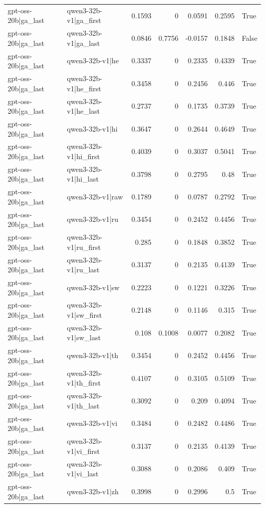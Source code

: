 \begin{table}
\begin{tabular}{l l r r r r l}
gpt-oss-20b|ga_last & qwen3-32b-v1|ga_first & 0.1593 & 0 & 0.0591 & 0.2595 & True \\
gpt-oss-20b|ga_last & qwen3-32b-v1|ga_last & 0.0846 & 0.7756 & -0.0157 & 0.1848 & False \\
gpt-oss-20b|ga_last & qwen3-32b-v1|he & 0.3337 & 0 & 0.2335 & 0.4339 & True \\
gpt-oss-20b|ga_last & qwen3-32b-v1|he_first & 0.3458 & 0 & 0.2456 & 0.446 & True \\
gpt-oss-20b|ga_last & qwen3-32b-v1|he_last & 0.2737 & 0 & 0.1735 & 0.3739 & True \\
gpt-oss-20b|ga_last & qwen3-32b-v1|hi & 0.3647 & 0 & 0.2644 & 0.4649 & True \\
gpt-oss-20b|ga_last & qwen3-32b-v1|hi_first & 0.4039 & 0 & 0.3037 & 0.5041 & True \\
gpt-oss-20b|ga_last & qwen3-32b-v1|hi_last & 0.3798 & 0 & 0.2795 & 0.48 & True \\
gpt-oss-20b|ga_last & qwen3-32b-v1|raw & 0.1789 & 0 & 0.0787 & 0.2792 & True \\
gpt-oss-20b|ga_last & qwen3-32b-v1|ru & 0.3454 & 0 & 0.2452 & 0.4456 & True \\
gpt-oss-20b|ga_last & qwen3-32b-v1|ru_first & 0.285 & 0 & 0.1848 & 0.3852 & True \\
gpt-oss-20b|ga_last & qwen3-32b-v1|ru_last & 0.3137 & 0 & 0.2135 & 0.4139 & True \\
gpt-oss-20b|ga_last & qwen3-32b-v1|sw & 0.2223 & 0 & 0.1221 & 0.3226 & True \\
gpt-oss-20b|ga_last & qwen3-32b-v1|sw_first & 0.2148 & 0 & 0.1146 & 0.315 & True \\
gpt-oss-20b|ga_last & qwen3-32b-v1|sw_last & 0.108 & 0.1008 & 0.0077 & 0.2082 & True \\
gpt-oss-20b|ga_last & qwen3-32b-v1|th & 0.3454 & 0 & 0.2452 & 0.4456 & True \\
gpt-oss-20b|ga_last & qwen3-32b-v1|th_first & 0.4107 & 0 & 0.3105 & 0.5109 & True \\
gpt-oss-20b|ga_last & qwen3-32b-v1|th_last & 0.3092 & 0 & 0.209 & 0.4094 & True \\
gpt-oss-20b|ga_last & qwen3-32b-v1|vi & 0.3484 & 0 & 0.2482 & 0.4486 & True \\
gpt-oss-20b|ga_last & qwen3-32b-v1|vi_first & 0.3137 & 0 & 0.2135 & 0.4139 & True \\
gpt-oss-20b|ga_last & qwen3-32b-v1|vi_last & 0.3088 & 0 & 0.2086 & 0.409 & True \\
gpt-oss-20b|ga_last & qwen3-32b-v1|zh & 0.3998 & 0 & 0.2996 & 0.5 & True \\

\end{tabular}
\end{table}

